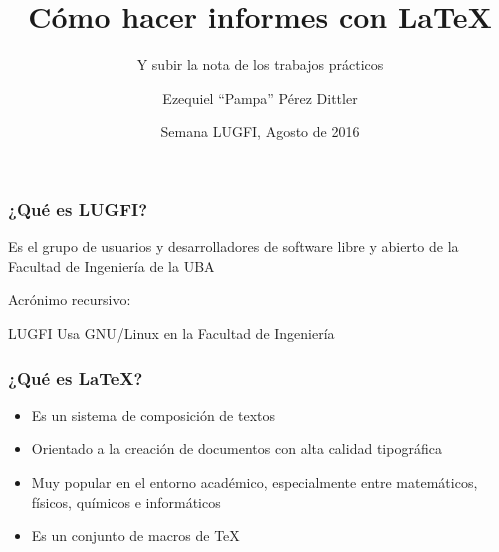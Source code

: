 \documentclass[svgnames]{beamer}
\title{Cómo hacer informes con \LaTeX}
\subtitle{Y subir la nota de los trabajos prácticos}
\author{Ezequiel ``Pampa'' Pérez Dittler}
\date{Semana LUGFI, Agosto de 2016}
\begin{document}
\frame{\titlepage}

\begin{frame}
	\frametitle{¿Qué es LUGFI?}
	
	Es el grupo de usuarios y desarrolladores de software libre y abierto de la Facultad de Ingeniería de la UBA
	
	Acrónimo recursivo:
	
	LUGFI Usa GNU/Linux en la Facultad de Ingeniería
\end{frame}

\begin{frame}
	\frametitle{¿Qué es \LaTeX?}
	\begin{itemize}
		\item Es un sistema de composición de textos
		\item Orientado a la creación de documentos con alta calidad tipográfica
		\item Muy popular en el entorno académico, especialmente entre matemáticos, físicos, químicos e informáticos
		\item Es un conjunto de macros de \TeX
	\end{itemize}
\end{frame}
\end{document}
